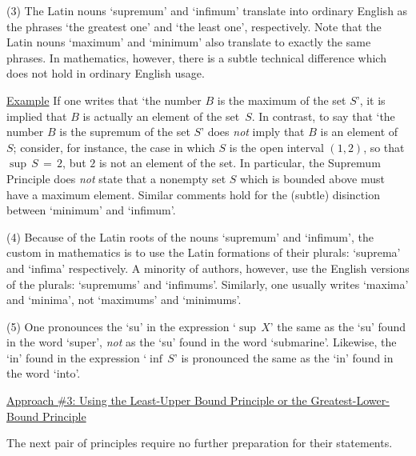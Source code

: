        (3) The Latin nouns `supremum' and `infimum' translate into ordinary English as the phrases `the greatest one' and `the least one', respectively.
    Note that the Latin nouns `maximum' and `minimum' also translate to exactly the same phrases.
    In mathematics, however, there is a subtle technical difference which does not hold in ordinary English usage.

\VA

        \underline{Example} If one writes that `the number $B$ is the maximum of the set $S$', it is implied that $B$ is actually an element of the set~$S$.
    In contrast, to say that `the number $B$ is the supremum of the set $S$' does {\em not} imply that $B$ is an element of~$S$;
    consider, for instance, the case in which $S$ is the open interval $(1,2)$, so that ${\sup}\,S \,=\, 2$, but $2$ is not an element of the set.
    In particular, the Supremum Principle does {\em not} state that a nonempty set $S$ which is bounded above must have a maximum element.
    Similar comments hold for the (subtle) disinction between `minimum' and `infimum'.

\V

        (4) Because of the Latin roots of the nouns `supremum' and `infimum', the custom in mathematics is to use the Latin formations of their plurals: 
    `suprema' and `infima' respectively. A minority of authors, however, use the English versions of the plurals: `supremums' and `infimums'.
    Similarly, one usually writes `maxima' and `minima', not `maximums' and `minimums'.

\V

        (5) One pronounces the `su' in the expression `${\sup}\,X$' the same as the `su' found in the word `super', {\em not} as the `su' found in the word `submarine'.
    Likewise, the `in' found in the expression `${\inf}\,S$' is pronounced the same as the `in' found in the word `into'.



\VV

        \underline{Approach \#3: Using the Least-Upper Bound Principle or the Greatest-Lower-Bound Principle}

\V

        The next pair of principles require no further preparation for their statements.

